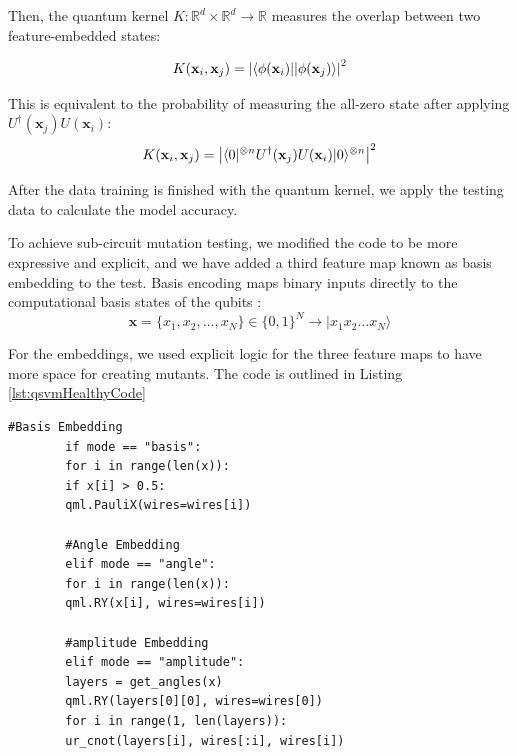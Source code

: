 \documentclass[12pt,a4paper]{article}
\DeclarePairedDelimiter\bra{\langle}{\rvert}
\DeclarePairedDelimiter\ket{\lvert}{\rangle}
\begin{document}
	Then, the quantum kernel $K: \mathbb{R}^d \times \mathbb{R}^d \to \mathbb{R}$ measures the overlap between two feature-embedded states:
	
	\begin{equation}
		K(\mathbf{x}_i, \mathbf{x}_j) = \left| \bra{\phi(\mathbf{x}_i)} \ket{\phi(\mathbf{x}_j)} \right|^2
	\end{equation}
	
	This is equivalent to the probability of measuring the all-zero state after applying $U^\dagger(\mathbf{x}_j)U(\mathbf{x}_i)$:
	\begin{equation}
		K(\mathbf{x}_i, \mathbf{x}_j) = \left| \bra{0}^{\otimes n} U^\dagger(\mathbf{x}_j) U(\mathbf{x}_i) \ket{0}^{\otimes n} \right|^2
	\end{equation}
	
	
	After the data training is finished with the quantum kernel, we apply the testing data to calculate the model accuracy.
	
	To achieve sub-circuit mutation testing, we modified the code to be more expressive and explicit, and we have added a third feature map known as basis embedding to the test. Basis encoding maps binary inputs directly to the computational basis states of the qubits \cite{schuld2018}:
			$$ \mathbf{x} = \{x_1, x_2, \dots, x_N\} \in \{0,1\}^N \rightarrow |x_1 x_2 \dots x_N\rangle $$
		
		For the embeddings, we used explicit logic for the three feature maps to have more space for creating mutants. The code is outlined in Listing \ref{lst:qsvmHealthyCode}
	
	\begin{lstlisting}[caption=Standard QSVM Script (Explicit Embedding Logic), label={lst:qsvmHealthyCode}]
		#Basis Embedding
		if mode == "basis":
		for i in range(len(x)):
		if x[i] > 0.5: 
		qml.PauliX(wires=wires[i])
		
		#Angle Embedding
		elif mode == "angle":
		for i in range(len(x)):
		qml.RY(x[i], wires=wires[i])
		
		#amplitude Embedding		
		elif mode == "amplitude":
		layers = get_angles(x)
		qml.RY(layers[0][0], wires=wires[0])
		for i in range(1, len(layers)): 
		ur_cnot(layers[i], wires[:i], wires[i])
	\end{lstlisting}
	
\end{document}
